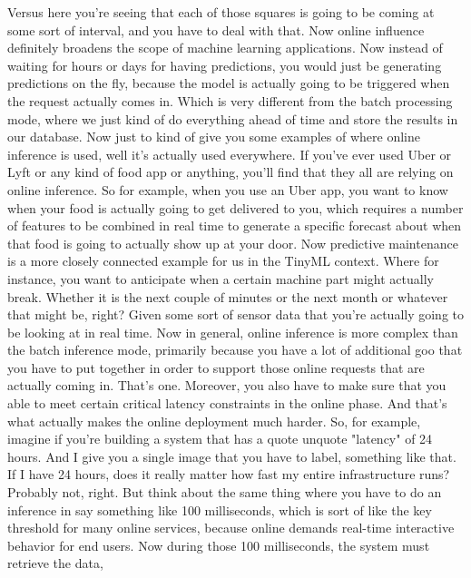 {{{{{{{    Versus here you're seeing that each of those squares
    is going to be coming at some sort of interval,
    and you have to deal with that.
    Now online influence definitely broadens the scope
    of machine learning applications.
    Now instead of waiting for hours or days for having predictions,
    you would just be generating predictions on the fly,
    because the model is actually going to be triggered when the request actually
    comes in.
    Which is very different from the batch processing
    mode, where we just kind of do everything ahead of time
    and store the results in our database.
    Now just to kind of give you some examples
    of where online inference is used, well it's actually used everywhere.
    If you've ever used Uber or Lyft or any kind of food app or anything,
    you'll find that they all are relying on online inference.
    So for example, when you use an Uber app,
    you want to know when your food is actually
    going to get delivered to you, which requires a number of features
    to be combined in real time to generate a specific forecast about when
    that food is going to actually show up at your door.
    Now predictive maintenance is a more closely connected example for us
    in the TinyML context.
    Where for instance, you want to anticipate when a certain machine
    part might actually break.
    Whether it is the next couple of minutes or the next month
    or whatever that might be, right?
    Given some sort of sensor data that you're actually
    going to be looking at in real time.
    Now in general, online inference is more complex than the batch inference mode,
    primarily because you have a lot of additional goo
    that you have to put together in order to support those online requests that
    are actually coming in.
    That's one.
    Moreover, you also have to make sure that you
    able to meet certain critical latency constraints in the online phase.
    And that's what actually makes the online deployment much harder.
    So, for example, imagine if you're building
    a system that has a quote unquote "latency" of 24 hours.
    And I give you a single image that you have to label, something like that.
    If I have 24 hours, does it really matter
    how fast my entire infrastructure runs?
    Probably not, right.
    But think about the same thing where you have
    to do an inference in say something like 100 milliseconds, which
    is sort of like the key threshold for many online services,
    because online demands real-time interactive behavior for end users.
    Now during those 100 milliseconds, the system must retrieve the data,
}}}}}}}

